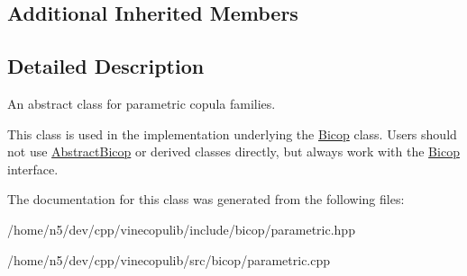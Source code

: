 \subsection*{Additional Inherited Members}


\subsection{Detailed Description}
An abstract class for parametric copula families. 

This class is used in the implementation underlying the \hyperlink{classvinecopulib_1_1_bicop}{Bicop} class. Users should not use \hyperlink{classvinecopulib_1_1_abstract_bicop}{Abstract\+Bicop} or derived classes directly, but always work with the \hyperlink{classvinecopulib_1_1_bicop}{Bicop} interface. 

The documentation for this class was generated from the following files\+:\begin{DoxyCompactItemize}
\item 
/home/n5/dev/cpp/vinecopulib/include/bicop/parametric.\+hpp\item 
/home/n5/dev/cpp/vinecopulib/src/bicop/parametric.\+cpp\end{DoxyCompactItemize}
